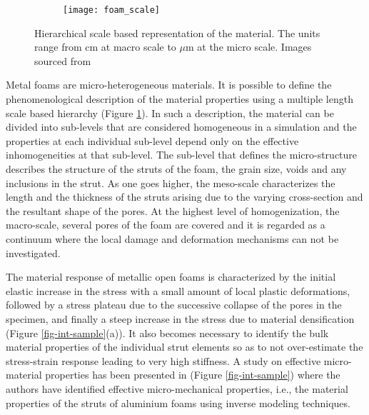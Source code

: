 \begin{figure}
	\centering
	\begin{subfigure}{\textwidth}
		\texttt{[image: foam\_scale]}
	\end{subfigure}
\caption{Hierarchical scale based representation of the material. The units range from cm at macro scale to $ \mu $m at the micro scale. Images sourced from \cite{jangMicrostructureOpencellFoams2008,jungOpencellAluminiumFoams2015}}\label{fig-int-scale}
\end{figure}

Metal foams are micro-heterogeneous materials. It is possible to define the phenomenological description of the material properties using a multiple length scale based hierarchy (Figure \ref{fig-int-scale}). In such a description, the material can be divided into sub-levels that are considered homogeneous in a simulation and the properties at each individual sub-level depend only on the effective inhomogeneities at that sub-level. The sub-level that defines the micro-structure describes the structure of the struts of the foam, the grain size, voids and any inclusions in the strut. As one goes higher, the meso-scale characterizes the length and the thickness of the struts arising due to the varying cross-section and the resultant shape of the pores. At the highest level of homogenization, the macro-scale, several pores of the foam are covered and it is regarded as a continuum where the local damage and deformation mechanisms can not be investigated.

The material response of metallic open foams is characterized by the initial elastic increase in the stress with a small amount of local plastic deformations, followed by a stress plateau due to the successive collapse of the pores in the specimen, and finally a steep increase in the stress due to material densification (Figure \ref{fig-int-sample}(a)). It also becomes necessary to identify the bulk material properties of the individual strut elements so as to not over-estimate the stress-strain response leading to very high stiffness\cite{jungModellingMetalFoams2016}. A study on effective  micro-material properties has been presented in \cite{heinzeExperimentalNumericalInvestigation2018} (Figure \ref{fig-int-sample}) where the authors have identified effective micro-mechanical properties, i.e., the material properties of the struts of aluminium foams using inverse modeling techniques.

